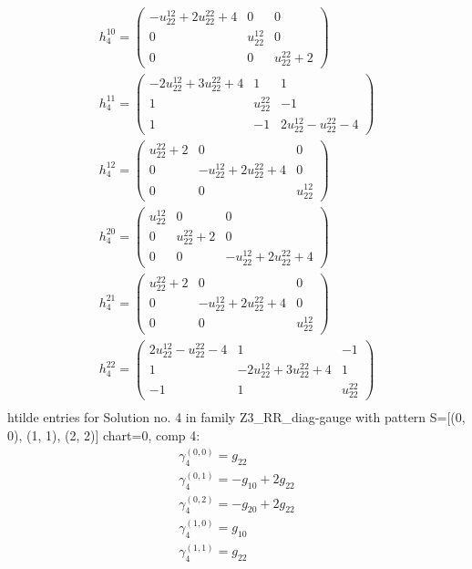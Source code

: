 \documentclass[a4paper, 11pt, twoside, onecolumn]{article}
\begin{document}
\begin{landscape}
\begin{gather*}
	 h_4^{10}=\begin{pmatrix}- u^{12}_{22} + 2 u^{22}_{22} + 4 & 0 & 0\\0 & u^{12}_{22} & 0\\0 & 0 & u^{22}_{22} + 2\end{pmatrix}\\ 
	 h_4^{11}=\begin{pmatrix}- 2 u^{12}_{22} + 3 u^{22}_{22} + 4 & 1 & 1\\1 & u^{22}_{22} & -1\\1 & -1 & 2 u^{12}_{22} - u^{22}_{22} - 4\end{pmatrix}\\ 
	 h_4^{12}=\begin{pmatrix}u^{22}_{22} + 2 & 0 & 0\\0 & - u^{12}_{22} + 2 u^{22}_{22} + 4 & 0\\0 & 0 & u^{12}_{22}\end{pmatrix}\\ 
	 h_4^{20}=\begin{pmatrix}u^{12}_{22} & 0 & 0\\0 & u^{22}_{22} + 2 & 0\\0 & 0 & - u^{12}_{22} + 2 u^{22}_{22} + 4\end{pmatrix}\\ 
	 h_4^{21}=\begin{pmatrix}u^{22}_{22} + 2 & 0 & 0\\0 & - u^{12}_{22} + 2 u^{22}_{22} + 4 & 0\\0 & 0 & u^{12}_{22}\end{pmatrix}\\ 
	 h_4^{22}=\begin{pmatrix}2 u^{12}_{22} - u^{22}_{22} - 4 & 1 & -1\\1 & - 2 u^{12}_{22} + 3 u^{22}_{22} + 4 & 1\\-1 & 1 & u^{22}_{22}\end{pmatrix}\\ 
\end{gather*} 
htilde entries for Solution no. 4 in family Z3_RR_diag-gauge with pattern S=[(0, 0), (1, 1), (2, 2)] chart=0, comp 4: 
\begin{gather*} 
	 \gamma^{(0, 0)}_4=g_{22}\\ 
	 \gamma^{(0, 1)}_4=- g_{10} + 2 g_{22}\\ 
	 \gamma^{(0, 2)}_4=- g_{20} + 2 g_{22}\\ 
	 \gamma^{(1, 0)}_4=g_{10}\\ 
	 \gamma^{(1, 1)}_4=g_{22}\\ 

\end{gather*}
\end{landscape}
\end{document}
